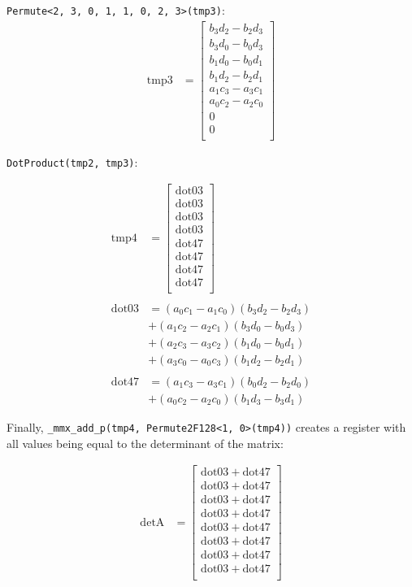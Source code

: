 \documentclass[]{scrartcl}
\newcommand{\pth}[1]{\left(#1\right)}
\begin{document}
\texttt{Permute<2, 3, 0, 1, 1, 0, 2, 3>(tmp3)}:
\begin{align*}
\mathrm{tmp3} 
&=
\begin{bmatrix}
b_3d_2 - b_2d_3\\
b_3d_0 - b_0d_3\\
b_1d_0 - b_0d_1\\
b_1d_2 - b_2d_1\\
a_1c_3 - a_3c_1\\
a_0c_2 - a_2c_0\\
0\\
0\\
\end{bmatrix}
\end{align*}

\texttt{DotProduct(tmp2, tmp3)}:

\begin{align*}
\mathrm{tmp4} 
&=
\begin{bmatrix}
	\mathrm{dot03}\\
	\mathrm{dot03}\\
	\mathrm{dot03}\\
	\mathrm{dot03}\\
	\mathrm{dot47}\\
	\mathrm{dot47}\\
	\mathrm{dot47}\\
	\mathrm{dot47}\\
\end{bmatrix}\\
\\
\mathrm{dot03}
&=\pth{a_0c_1 - a_1c_0}\pth{b_3d_2 - b_2d_3}\\
&+\pth{a_1c_2 - a_2c_1}\pth{b_3d_0 - b_0d_3}\\
&+\pth{a_2c_3 - a_3c_2}\pth{b_1d_0 - b_0d_1}\\
&+\pth{a_3c_0 - a_0c_3}\pth{b_1d_2 - b_2d_1}\\
\\
\mathrm{dot47}
&=\pth{a_1c_3 - a_3c_1}\pth{b_0d_2 - b_2d_0}\\
&+\pth{a_0c_2 - a_2c_0}\pth{b_1d_3 - b_3d_1}
\end{align*}

Finally, \texttt{_mmx_add_p(tmp4, Permute2F128<1, 0>(tmp4))} creates a register with all values being equal to the determinant of the matrix:

\begin{align*}
\mathrm{detA} 
&=
\begin{bmatrix}
\mathrm{dot03} + \mathrm{dot47}\\
\mathrm{dot03} + \mathrm{dot47}\\
\mathrm{dot03} + \mathrm{dot47}\\
\mathrm{dot03} + \mathrm{dot47}\\
\mathrm{dot03} + \mathrm{dot47}\\
\mathrm{dot03} + \mathrm{dot47}\\
\mathrm{dot03} + \mathrm{dot47}\\
\mathrm{dot03} + \mathrm{dot47}\\
\end{bmatrix}\\
\end{align*}
\end{document}
